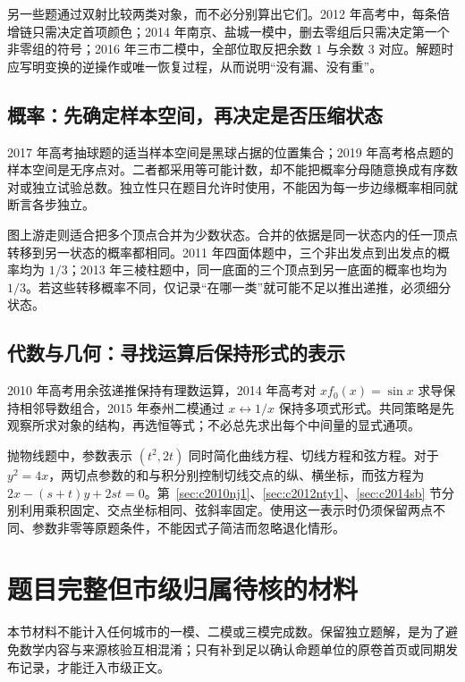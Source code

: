 \documentclass[UTF8,12pt,a4paper,fontset=fandol]{ctexart}
\begin{document}
另一些题通过双射比较两类对象，而不必分别算出它们。2012 年高考中，每条倍增链只需决定首项颜色；2014 年南京、盐城一模中，删去零组后只需决定第一个非零组的符号；2016 年三市二模中，全部位取反把余数 $1$ 与余数 $3$ 对应。解题时应写明变换的逆操作或唯一恢复过程，从而说明“没有漏、没有重”。

\subsection{概率：先确定样本空间，再决定是否压缩状态}
2017 年高考抽球题的适当样本空间是黑球占据的位置集合；2019 年高考格点题的样本空间是无序点对。二者都采用等可能计数，却不能把概率分母随意换成有序数对或独立试验总数。独立性只在题目允许时使用，不能因为每一步边缘概率相同就断言各步独立。

图上游走则适合把多个顶点合并为少数状态。合并的依据是同一状态内的任一顶点转移到另一状态的概率都相同。2011 年四面体题中，三个非出发点到出发点的概率均为 $1/3$；2013 年三棱柱题中，同一底面的三个顶点到另一底面的概率也均为 $1/3$。若这些转移概率不同，仅记录“在哪一类”就可能不足以推出递推，必须细分状态。

\subsection{代数与几何：寻找运算后保持形式的表示}
2010 年高考用余弦递推保持有理数运算，2014 年高考对 $xf_0(x)=\sin x$ 求导保持相邻导数组合，2015 年泰州二模通过 $x\leftrightarrow1/x$ 保持多项式形式。共同策略是先观察所求对象的结构，再选恒等式；不必总先求出每个中间量的显式通项。

抛物线题中，参数表示 $(t^2,2t)$ 同时简化曲线方程、切线方程和弦方程。对于 $y^2=4x$，两切点参数的和与积分别控制切线交点的纵、横坐标，而弦方程为 $2x-(s+t)y+2st=0$。第~\ref{sec:c2010nj1}、\ref{sec:c2012nty1}、\ref{sec:c2014sb} 节分别利用乘积固定、交点坐标相同、弦斜率固定。使用这一表示时仍须保留两点不同、参数非零等原题条件，不能因式子简洁而忽略退化情形。

\section{题目完整但市级归属待核的材料}\label{sec:unattributed}
本节材料不能计入任何城市的一模、二模或三模完成数。保留独立题解，是为了避免数学内容与来源核验互相混淆；只有补到足以确认命题单位的原卷首页或同期发布记录，才能迁入市级正文。
\end{document}

